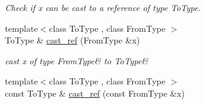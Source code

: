 \begin{DoxyCompactItemize}
\begin{DoxyCompactList}\small\item\em Check if x can be cast to a reference of type To\+Type. \end{DoxyCompactList}\item 
\hypertarget{namespaceSpacy_abb0550fc1d402f00e42c165ae8eb3305}{}{\footnotesize template$<$class To\+Type , class From\+Type $>$ }\\To\+Type \& \hyperlink{namespaceSpacy_abb0550fc1d402f00e42c165ae8eb3305}{cast\+\_\+ref} (From\+Type \&x)\label{namespaceSpacy_abb0550fc1d402f00e42c165ae8eb3305}

\begin{DoxyCompactList}\small\item\em cast x of type \textquotesingle{}From\+Type\&\textquotesingle{} to \textquotesingle{}To\+Type\&\textquotesingle{} \end{DoxyCompactList}\item 
\hypertarget{namespaceSpacy_a00fc9d674cd8813c4e20a05adf3aaaa4}{}{\footnotesize template$<$class To\+Type , class From\+Type $>$ }\\const To\+Type \& \hyperlink{namespaceSpacy_a00fc9d674cd8813c4e20a05adf3aaaa4}{cast\+\_\+ref} (const From\+Type \&x)\label{namespaceSpacy_a00fc9d674cd8813c4e20a05adf3aaaa4}


\end{DoxyCompactItemize}
